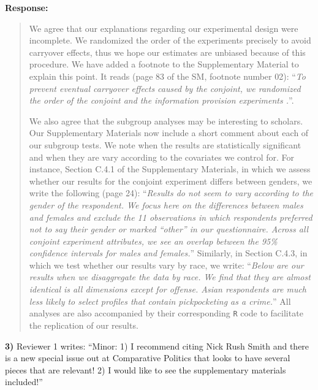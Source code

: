 \documentclass[a4paper,12pt]{article}
\begin{document}
\noindent \textbf{Response:} 
\begin{quote}

We agree that our explanations regarding our experimental design were
incomplete. We randomized the order of the experiments precisely to avoid
carryover effects, thus we hope our estimates are unbiased because of this
procedure. We have added a footnote to the Supplementary Material to explain
this point. It reads (page 83 of the SM, footnote number 02): ``\textit{To
  prevent eventual carryover effects caused by the conjoint, we randomized the
  order of the conjoint and the information provision experiments
\citep{perreault1975controlling}.}''.

We also agree that the subgroup analyses may be interesting to scholars. Our
Supplementary Materials now include a short comment about each of our subgroup
tests. We note when the results are statistically significant and when they are
vary according to the covariates we control for. For instance, Section C.4.1 of
the Supplementary Materials, in which we assess whether our results for the
conjoint experiment differs between genders, we write the following (page 24):
``\textit{Results do not seem to vary according to the gender of the
  respondent. We focus here on the differences between males and females and
  exclude the 11 observations in which respondents preferred not to say their
  gender or marked ``other'' in our questionnaire. Across all conjoint
experiment attributes, we see an overlap between the 95\% confidence intervals
for males and females.}'' Similarly, in Section C.4.3, in which we test whether
our results vary by race, we write: ``\textit{Below are our results when we
disaggregate the data by race. We find that they are almost identical is all
dimensions except for offense. Asian respondents are much less likely to select
profiles that contain pickpocketing as a crime.}''  All analyses are also
accompanied by their corresponding \texttt{R} code to facilitate the
replication of our results.

\end{quote}

\vspace{.3cm}

\noindent \textbf{3)} Reviewer 1 writes: ``Minor: 1) I recommend citing Nick
Rush Smith and there is a new special issue out at Comparative Politics that
looks to have several pieces that are relevant! 2) I would like to see the
supplementary materials included!''

\vspace{.3cm}
\end{document}

